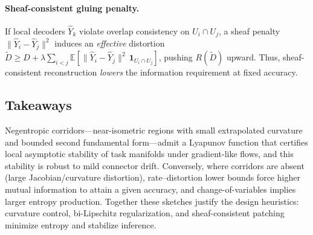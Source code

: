 \documentclass{article}
\theoremstyle{definition}
\begin{document}
\paragraph{Sheaf-consistent gluing penalty.}
If local decoders $\widehat Y_k$ violate overlap consistency on $U_i\cap U_j$,
a sheaf penalty $\|\widehat Y_i-\widehat Y_j\|^2$ induces an \emph{effective}
distortion $\widetilde D \ge D + \lambda \sum_{i<j} \mathbb{E}
[\|\widehat Y_i-\widehat Y_j\|^2\,\mathbf{1}_{U_i\cap U_j}]$, pushing $R(\widetilde D)$
upward. Thus, sheaf-consistent reconstruction \emph{lowers} the information
requirement at fixed accuracy.

\subsection{Takeaways}

Negentropic corridors---near-isometric regions with small extrapolated curvature
and bounded second fundamental form---admit a Lyapunov function that certifies
local asymptotic stability of task manifolds under gradient-like flows, and this
stability is robust to mild connector drift. Conversely, where corridors are
absent (large Jacobian/curvature distortion), rate--distortion lower bounds
force higher mutual information to attain a given accuracy, and change-of-variables
implies larger entropy production. Together these sketches justify the design
heuristics: curvature control, bi-Lipschitz regularization, and sheaf-consistent
patching minimize entropy and stabilize inference.


\newpage


\end{document}
